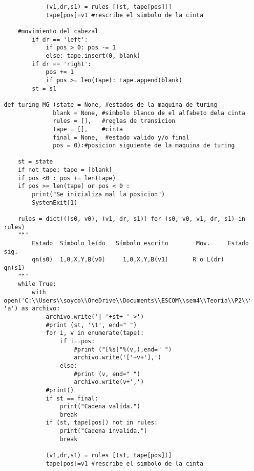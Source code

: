 \begin{lstlisting}
            (v1,dr,s1) = rules [(st, tape[pos])]
            tape[pos]=v1 #rescribe el simbolo de la cinta
    
    #movimiento del cabezal
        if dr == 'left':
            if pos > 0: pos -= 1
            else: tape.insert(0, blank)
        if dr == 'right':
            pos += 1
            if pos >= len(tape): tape.append(blank)
        st = s1

def turing_MG (state = None, #estados de la maquina de turing
              blank = None, #simbolo blanco de el alfabeto dela cinta
              rules = [],   #reglas de transicion
              tape = [],    #cinta
              final = None,  #estado valido y/o final
              pos = 0):#posicion siguiente de la maquina de turing

    st = state
    if not tape: tape = [blank]
    if pos <0 : pos += len(tape)
    if pos >= len(tape) or pos < 0 : 
        print("Se inicializa mal la posicion")
        SystemExit(1)
    
    rules = dict(((s0, v0), (v1, dr, s1)) for (s0, v0, v1, dr, s1) in rules)
    """
        Estado	Símbolo leído	Símbolo escrito	       Mov. 	Estado sig.
        qn(s0)  1,0,X,Y,B(v0)	  1,0,X,Y,B(v1)       R o L(dr)	   qn(s1)
    """
    while True:
        with open('C:\\Users\\soyco\\OneDrive\\Documents\\ESCOM\\sem4\\Teoria\\P2\\turing\\output\\turing.txt', 'a') as archivo:
            archivo.write('|-'+st+ '->')
            #print (st, '\t', end=" ")
            for i, v in enumerate(tape):
                if i==pos: 
                    #print ("[%s]"%(v,),end=" ")
                    archivo.write('['+v+'],')
                else: 
                    #print (v, end=" ")
                    archivo.write(v+',') 
            #print()
            if st == final: 
                print("Cadena valida.")
                break
            if (st, tape[pos]) not in rules: 
                print("Cadena invalida.")
                break
            
            (v1,dr,s1) = rules [(st, tape[pos])]
            tape[pos]=v1 #rescribe el simbolo de la cinta
    

\end{lstlisting}
